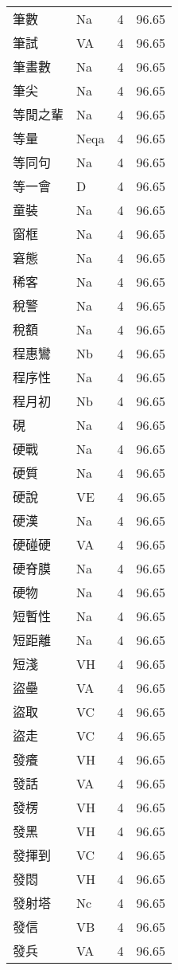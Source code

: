 \documentclass[twocolumn]{book}
\begin{document}
\begin{supertabular}{llrr}
筆數 & Na & 4 &  96.65\\
筆試 & VA & 4 &  96.65\\
筆畫數 & Na & 4 &  96.65\\
筆尖 & Na & 4 &  96.65\\
等閒之輩 & Na & 4 &  96.65\\
等量 & Neqa & 4 &  96.65\\
等同句 & Na & 4 &  96.65\\
等一會 & D & 4 &  96.65\\
童裝 & Na & 4 &  96.65\\
窗框 & Na & 4 &  96.65\\
窘態 & Na & 4 &  96.65\\
稀客 & Na & 4 &  96.65\\
稅警 & Na & 4 &  96.65\\
稅額 & Na & 4 &  96.65\\
程惠鸞 & Nb & 4 &  96.65\\
程序性 & Na & 4 &  96.65\\
程月初 & Nb & 4 &  96.65\\
硯 & Na & 4 &  96.65\\
硬戰 & Na & 4 &  96.65\\
硬質 & Na & 4 &  96.65\\
硬說 & VE & 4 &  96.65\\
硬漢 & Na & 4 &  96.65\\
硬碰硬 & VA & 4 &  96.65\\
硬脊膜 & Na & 4 &  96.65\\
硬物 & Na & 4 &  96.65\\
短暫性 & Na & 4 &  96.65\\
短距離 & Na & 4 &  96.65\\
短淺 & VH & 4 &  96.65\\
盜壘 & VA & 4 &  96.65\\
盜取 & VC & 4 &  96.65\\
盜走 & VC & 4 &  96.65\\
發癢 & VH & 4 &  96.65\\
發話 & VA & 4 &  96.65\\
發楞 & VH & 4 &  96.65\\
發黑 & VH & 4 &  96.65\\
發揮到 & VC & 4 &  96.65\\
發悶 & VH & 4 &  96.65\\
發射塔 & Nc & 4 &  96.65\\
發信 & VB & 4 &  96.65\\
發兵 & VA & 4 &  96.65\\

\end{supertabular}
\end{document}
